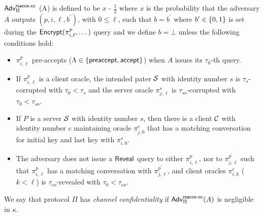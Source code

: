 \begin{definition} \label{def:rsacce-cc}
 $\mathsf{Adv}^{\mathsf{rsacce\textsc{-} cc}}_{\Pi}$ (A) is defined to be
 $x$ - $\frac{1}{2}$ where $x$ is the probability that
 the adversary $A$ outputs $(p, i, \ell, b^{\prime})$,
 with $0\leq \ell$, such that $b = b^{\prime}$ where
 $b^{\prime} \in \{0,1\}$ is set during the
 $\mathsf{Encrypt}(\pi^p_{i,\ell},\dots)$ query and we define
 $b=\bot$ unless the following conditions hold:
 \begin{itemize}
  \item{$\pi^p_{i,\ell}$ pre-accepts
  ($\Lambda \in \{\mathsf{preaccept}, \mathsf{accept} \}$) when $A$
  issues its $\tau_0$-th query.}

  \item{If $\pi^p_{i,\ell}$ is a client oracle, the
  intended pater $\mathcal{S}$ with identity number $s$ is $\tau_s$-corrupted
  with $\tau_0 < \tau_s$ and the server oracle $\pi^s_{j,\ell}$ is
  $\tau_{so}$-corrupted with $\tau_0 < \tau_{so}$.}

  \item{If $P$ is a server $\mathcal{S}$ with identity number $s$, then there
  is a client $\mathcal{C}$ with identity number $c$ maintaining oracle
  $\pi^c_{j,0}$ that has a matching conversation for initial key and
  last key with $\pi^s_{i,0}$.}

  \item{The adversary does not issue a $\mathsf{Reveal}$ query
  to either $\pi^p_{i,\ell}$, nor to
  $\pi^{p^{\prime}}_{j,\ell}$ such that $\pi^p_{i,\ell}$
  has a matching conversation with
  $\pi^{p^{\prime}}_{j,\ell}$, and client oracles $\pi^c_{i,k}$
  ($k < \ell$) is $\tau_{co}$-revealed with $\tau_0 < \tau_{co}$.}
 \end{itemize}
 We say that protocol $\Pi$ has
 \textit{channel confidentiality} if
 $\mathsf{Adv}^{\mathsf{rsacce\textsc{-} cc}}_{\Pi}(A)$ is negligible in $\kappa$.
\end{definition}

